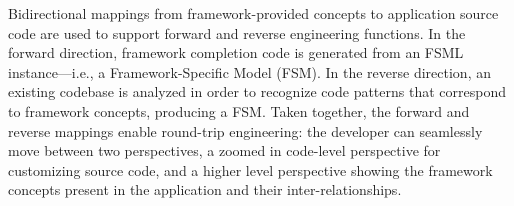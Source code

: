 \documentclass[oneside,11pt]{memoir}
\begin{document}
Bidirectional mappings from framework-provided concepts to application source code are used to support forward and reverse engineering functions. In the forward direction, framework completion code is generated from an FSML instance---i.e., a Framework-Specific Model (FSM). In the reverse direction, an existing codebase is analyzed in order to recognize code patterns that correspond to framework concepts, producing a FSM. Taken together, the forward and reverse mappings enable round-trip engineering: the developer can seamlessly move between two perspectives, a zoomed in code-level perspective for customizing source code, and a higher level perspective showing the framework concepts present in the application and their inter-relationships. 


%


\end{document}
